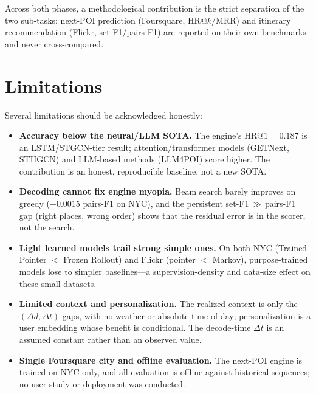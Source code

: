 Across both phases, a methodological contribution is the strict separation of the two
sub-tasks: next-POI prediction (Foursquare, $\mathrm{HR@}k$/$\mathrm{MRR}$) and itinerary
recommendation (Flickr, set-F1/pairs-F1) are reported on their own benchmarks and never
cross-compared.

\section{Limitations}
\label{sec:conc-limitations}

Several limitations should be acknowledged honestly:

\begin{itemize}
  \item \textbf{Accuracy below the neural/LLM SOTA.} The engine's $\mathrm{HR@}1=0.187$ is an
  LSTM/STGCN-tier result; attention/transformer models (GETNext, STHGCN) and LLM-based methods
  (LLM4POI) score higher. The contribution is an honest, reproducible baseline, not a new SOTA.

  \item \textbf{Decoding cannot fix engine myopia.} Beam search barely improves on greedy
  ($+0.0015$ pairs-F1 on NYC), and the persistent set-F1\,$\gg$\,pairs-F1 gap (right places,
  wrong order) shows that the residual error is in the scorer, not the search.

  \item \textbf{Light learned models trail strong simple ones.} On both NYC (Trained Pointer
  $<$ Frozen Rollout) and Flickr (pointer $<$ Markov), purpose-trained models lose to simpler
  baselines---a supervision-density and data-size effect on these small datasets.

  \item \textbf{Limited context and personalization.} The realized context is only the
  $(\Delta d,\Delta t)$ gaps, with no weather or absolute time-of-day; personalization is a
  user embedding whose benefit is conditional. The decode-time $\Delta t$ is an assumed
  constant rather than an observed value.

  \item \textbf{Single Foursquare city and offline evaluation.} The next-POI engine is trained
  on NYC only, and all evaluation is offline against historical sequences; no user study or
  deployment was conducted.
\end{itemize}

